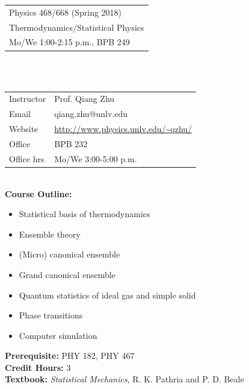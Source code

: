 \documentclass[11pt]{article}
\begin{document}
\begin{tabular}{ l }
  \LARGE Physics 468/668 (Spring 2018)\\
  \LARGE Thermodynamics/Statistical Physics \\
  \LARGE Mo/We 1:00-2:15 p.m., BPB 249 \\
\end{tabular}\\\\

\begin{tabular}{ l l }
  \large Instructor &\large Prof. Qiang Zhu \\
  \large Email      &\large qiang.zhu@unlv.edu \\
  \large Website    &\large \url{http://www.physics.unlv.edu/~qzhu/} \\
  \large Office     &\large BPB 232 \\
  \large Office hrs &\large Mo/We 3:00-5:00 p.m. \\
\end{tabular}\\

\textbf {\large Course Outline:}
\begin{itemize} 
\item Statistical basis of thermodynamics
\item Ensemble theory
\item (Micro) canonical ensemble
\item Grand canonical ensemble
\item Quantum statistics of ideal gas and simple solid
\item Phase transitions
\item Computer simulation\\
\end{itemize}

\textbf {Prerequisite:} PHY 182, PHY 467\\
\textbf {Credit Hours:} 3 \\
\textbf {\large Textbook:} \emph{Statistical Mechanics}, R. K. Pathria and P. D. Beale\\\\
\end{document}
